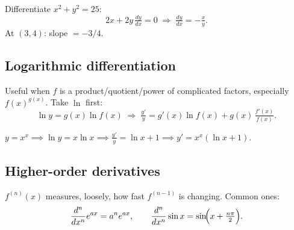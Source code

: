 \begin{example}[Circle]
Differentiate $x^2 + y^2 = 25$:
\[ 2x + 2y\,\tfrac{dy}{dx} = 0 \;\Longrightarrow\; \tfrac{dy}{dx} = -\tfrac{x}{y}. \]
At $(3,4)$: slope $= -3/4$.
\end{example}

\subsection{Logarithmic differentiation}
Useful when $f$ is a product/quotient/power of complicated factors, especially
$f(x)^{g(x)}$. Take $\ln$ first:
\[ \ln y = g(x) \ln f(x) \;\Longrightarrow\; \tfrac{y'}{y} = g'(x) \ln f(x) + g(x)\,\tfrac{f'(x)}{f(x)}. \]

\begin{example}
$y = x^x \implies \ln y = x \ln x \implies \tfrac{y'}{y} = \ln x + 1 \implies y' = x^x (\ln x + 1).$
\end{example}

\subsection{Higher-order derivatives}
$f^{(n)}(x)$ measures, loosely, how fast $f^{(n-1)}$ is changing. Common ones:
\[ \frac{d^n}{dx^n} e^{ax} = a^n e^{ax}, \qquad
   \frac{d^n}{dx^n} \sin x = \sin\!\Bigl(x + \tfrac{n\pi}{2}\Bigr). \]
